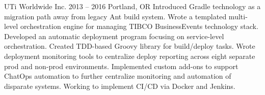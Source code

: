 {UTi Worldwide Inc.}
{2013 -- 2016}
{Portland, OR}
{Introduced Gradle technology as a migration path away from legacy Ant build system. Wrote a templated multi-level orchestration engine for managing TIBCO BusinessEvents technology stack. Developed an automatic deployment program focusing on service-level orchestration. Created TDD-based Groovy library for build/deploy tasks. Wrote deployment monitoring tools to centralize deploy reporting across eight separate prod and non-prod environments. Implemented custom add-ons to support ChatOps automation to further centralize monitoring and automation of disparate systems. Working to implement CI/CD via Docker and Jenkins.}

